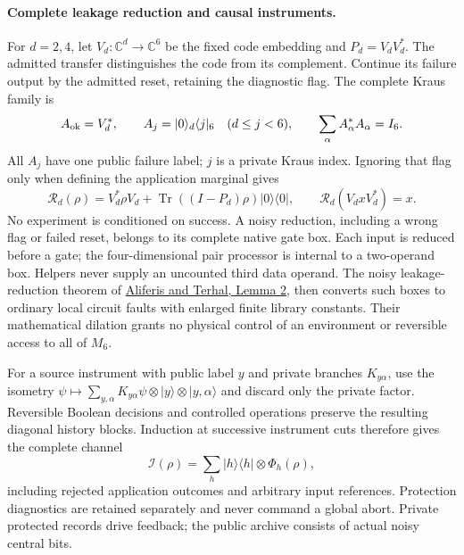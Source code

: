 \paragraph{Complete leakage reduction and causal instruments.}
For $d=2,4$, let $V_d:\mathbb C^d\to\mathbb C^6$ be the fixed code
embedding and $P_d=V_dV_d^*$. The admitted transfer distinguishes the code
from its complement. Continue its failure output by the admitted reset,
retaining the diagnostic flag. The complete Kraus family is
\[
 A_{\rm ok}=V_d^*,\qquad A_j=|0\rangle_d\langle j|_6\quad(d\le j<6),
 \qquad \sum_\alpha A_\alpha^*A_\alpha=I_6.
\]
All $A_j$ have one public failure label; $j$ is a private Kraus index.
Ignoring that flag only when defining the application marginal gives
\begin{equation}
 \mathcal R_d(\rho)=V_d^*\rho V_d+
       \operatorname{Tr}((I-P_d)\rho)|0\rangle\langle0|,
 \qquad \mathcal R_d(V_dxV_d^*)=x.
 \label{eq:native-complete-reduction}
\end{equation}
No experiment is conditioned on success. A noisy reduction, including a
wrong flag or failed reset, belongs to its complete native gate box.
Each input is reduced before a gate; the four-dimensional pair processor
is internal to a two-operand box. Helpers never supply an uncounted third
data operand. The noisy leakage-reduction theorem of
\href{https://arxiv.org/abs/quant-ph/0511065}{Aliferis and Terhal, Lemma 2},
then converts such boxes to ordinary local circuit faults with enlarged
finite library constants. Their mathematical dilation grants no physical
control of an environment or reversible access to all of $M_6$.

For a source instrument with public label $y$ and private branches
$K_{y\alpha}$, use the isometry
$\psi\mapsto\sum_{y,\alpha}K_{y\alpha}\psi\otimes|y\rangle
\otimes|y,\alpha\rangle$ and discard only the private factor.
Reversible Boolean decisions and controlled operations preserve the
resulting diagonal history blocks. Induction at successive instrument
cuts therefore gives the complete channel
\[
 \mathcal I(\rho)=\sum_h |h\rangle\langle h|\otimes\Phi_h(\rho),
\]
including rejected application outcomes and arbitrary input references.
Protection diagnostics are retained separately and never command a global
abort. Private protected records drive feedback; the public archive consists
of actual noisy central bits.

